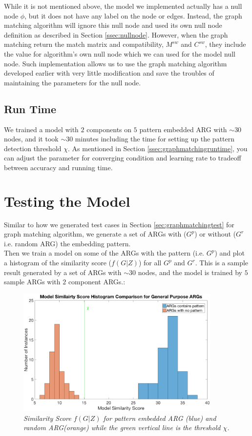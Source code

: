 While it is not mentioned above, the model we implemented actually has a null node $\phi$, but it does not have any label on the node or edges. Instead, the graph matching algorithm will ignore this null node and used its own null node definition as described in Section \ref{ssec:nullnode}. However, when the graph matching return the match matrix and compatibility, $M^{sw}$ and $C^{sw}$, they include the value for algorithm's own null node which we can used for the model null node. Such implementation allows us to use the graph matching algorithm developed earlier with very little modification and save the troubles of maintaining the parameters for the null node.

\subsection{Run Time}

We trained a model with $2$ components on $5$ pattern embedded ARG with $\sim30$ nodes, and it took $\sim 30$ minutes including the time for setting up the pattern detection threshold $\chi$. As mentioned in Section \ref{ssec:graphmatchingruntime}, you can adjust the parameter for converging condition and learning rate to tradeoff between accuracy and running time.

\section{Testing the Model}

Similar to how we generated test cases in Section \ref{sec:graphmatchingtest} for graph matching algorithm, we generate a set of ARGs with ($G^p$) or without ($G^r$ i.e. random ARG) the embedding pattern. \\

Then we train a model on some of the ARGs with the pattern (i.e. $G^p$) and plot a histogram of the similarity score ($f(G|Z)$) for all $G^p$ and $G^r$. This is a sample result generated by a set of ARGs with $\sim30$ nodes, and the model is trained by $5$ sample ARGs with $2$ component ARGs.:

\begin{figure}[h]
	\centering
	\captionsetup{justification=centering}
	\includegraphics[width=0.9\textwidth]{figs/pattern_learning.png}
	\caption[Caption for LOF]{\emph{Similarity Score $f(G|Z)$ for pattern embedded ARG (blue) and random ARG(orange) while the green vertical line is the threshold $\chi$.}}
	\label{fig:pattern_learning}
\end{figure}

